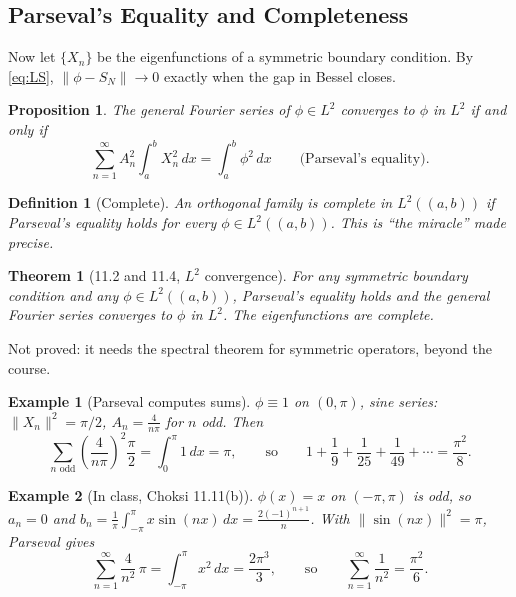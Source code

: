 \documentclass{article}
\newtheorem{theorem}{Theorem}
\newtheorem{definition}{Definition}
\newtheorem*{example}{Example}
\newtheorem{proposition}{Proposition}
\begin{document}
\subsection{Parseval's Equality and Completeness}
Now let $\{X_n\}$ be the eigenfunctions of a symmetric boundary condition. By \eqref{eq:LS}, $\|\phi - S_N\| \to 0$ exactly when the gap in Bessel closes.
\begin{proposition}
    The general Fourier series of $\phi \in L^2$ converges to $\phi$ in $L^2$ if and only if
    \begin{equation}\label{eq:parseval}
        \sum_{n=1}^\infty A_n^2\int_a^bX_n^2\,dx = \int_a^b\phi^2\,dx \qquad \text{(Parseval's equality)}.
    \end{equation}
\end{proposition}
\begin{definition}[Complete]
    An orthogonal family is complete in $L^2((a,b))$ if Parseval's equality holds for every $\phi \in L^2((a,b))$. This is ``the miracle'' made precise.
\end{definition}
\begin{theorem}[11.2 and 11.4, $L^2$ convergence]
    For any symmetric boundary condition and any $\phi \in L^2((a,b))$, Parseval's equality holds and the general Fourier series converges to $\phi$ in $L^2$. The eigenfunctions are complete.
\end{theorem}
Not proved: it needs the spectral theorem for symmetric operators, beyond the course.
\begin{example}[Parseval computes sums]
    $\phi \equiv 1$ on $(0,\pi)$, sine series: $\|X_n\|^2 = \pi/2$, $A_n = \frac{4}{n\pi}$ for $n$ odd. Then
    \begin{equation}
        \sum_{n \text{ odd}}\left(\frac{4}{n\pi}\right)^2\frac{\pi}{2} = \int_0^\pi 1\,dx = \pi, \qquad \text{so} \qquad 1 + \frac19 + \frac{1}{25} + \frac{1}{49} + \cdots = \frac{\pi^2}{8}.
    \end{equation}
\end{example}
\begin{example}[In class, Choksi 11.11(b)]
    $\phi(x) = x$ on $(-\pi,\pi)$ is odd, so $a_n = 0$ and $b_n = \frac{1}{\pi}\int_{-\pi}^\pi x\sin(nx)\,dx = \frac{2(-1)^{n+1}}{n}$. With $\|\sin(nx)\|^2 = \pi$, Parseval gives
    \begin{equation}
        \sum_{n=1}^\infty\frac{4}{n^2}\,\pi = \int_{-\pi}^\pi x^2\,dx = \frac{2\pi^3}{3}, \qquad \text{so} \qquad \sum_{n=1}^\infty\frac{1}{n^2} = \frac{\pi^2}{6}.
    \end{equation}
\end{example}
\end{document}
